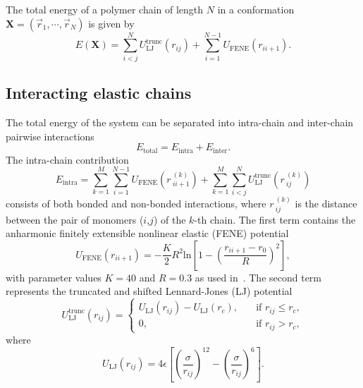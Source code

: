 \documentclass[12pt]{report}
\begin{document}
The total energy of a polymer chain of length $N$ in a conformation
$\mathbf{X} = (\vec{r}_1,\cdots,\vec{r}_{N})$ is given by
\begin{equation}
E(\mathbf{X}) = \sum^{N}_{i<j}
U_{\mathrm{LJ}}^{\mathrm{trunc}}(r_{ij}) + \sum^{N-1}_{i=1} 	
U_{\mathrm{FENE}}(r_{ii+1}). 
\label{totalE}
\end{equation}

\subsection{Interacting elastic chains}

 The total energy of
the system can be separated into intra-chain and inter-chain
pairwise interactions
\begin{equation}
E_{\mathrm{total}} = E_{\mathrm{intra}} + E_{\mathrm{inter}}.
\end{equation}
%
The intra-chain contribution 
\begin{equation}
E_{\mathrm{intra}} = \sum^{M}_{k = 1}\sum^{N-1}_{i = 1}
U_{\mathrm{FENE}}(r\,^{(k)}_{ii+1}) +
\sum^{M}_{k=1}\sum^{N}_{i<j}
U_{\mathrm{LJ}}^{\mathrm{trunc}}(r\,^{(k)}_{ij})
\end{equation}
%
consists of both bonded and non-bonded interactions, where
$r\,^{(k)}_{ij}$ is the distance between the pair of monomers
($i$,$j$) of the $k$-th chain. The first term contains the anharmonic
finitely extensible nonlinear elastic (FENE)
potential~\cite{Bird1987, Kremer1990, Milchev2001}
\begin{equation}
U_{\mathrm{FENE}}(r_{ii+1})=-\frac{K}{2}R^2 
\mathrm{ln}\left[1-\left(\frac{r_{ii+1}-r_0}{R}\right)^2\right],	
\label{FENE}
\end{equation}
%
with parameter values $K=40$ and $R=0.3$ as used in~\cite{Gross2013}.
The second term represents 
the truncated and shifted Lennard-Jones (LJ) potential
\begin{equation}
U_{\mathrm{LJ}}^{\mathrm{trunc}}(r_{ij}) = \left\{
\begin{array}{lr}
U_{\mathrm{LJ}}(r_{ij}) - U_{\mathrm{LJ}}(r_{c}), & \quad
\mathrm{if} \,\, r_{ij} \leq r_{c},\\
0, &  \quad \mathrm{if} \,\,r_{ij} > r_{c},
\end{array}
\right.
\end{equation}
%
where
\begin{equation}
U_{\mathrm{LJ}}(r_{ij})= 4\epsilon \left[ \left(
\frac{\sigma}{r_{ij}} \right)^{12} - \left(
\frac{\sigma}{r_{ij}} \right)^{6} \right].
\end{equation}
\end{document}
